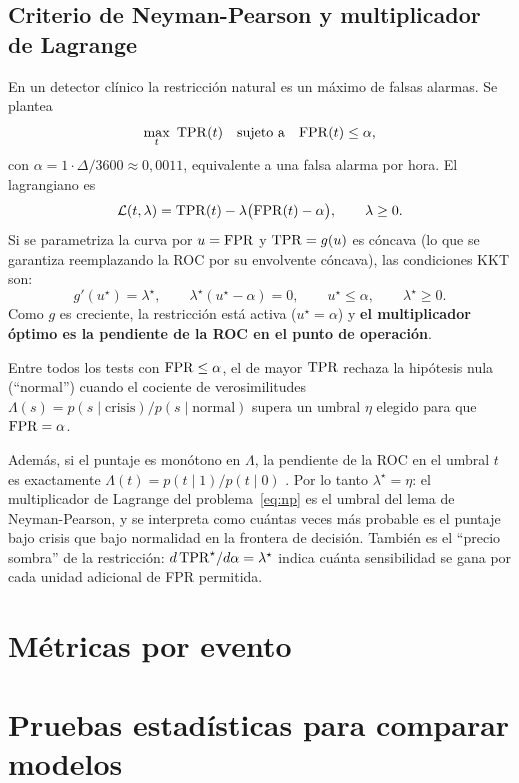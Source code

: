 \subsection{Criterio de Neyman-Pearson y multiplicador de Lagrange}

En un detector clínico la restricción natural es un máximo de falsas alarmas. Se plantea
\begin{equation}
\max_t\ \TPR(t)\quad\text{sujeto a}\quad\FPR(t)\le\alpha,
\label{eq:np}
\end{equation}
con $\alpha = 1\cdot\Delta/3600\approx 0{,}0011$, equivalente a una falsa alarma por hora. El lagrangiano es
\begin{equation}
\mathcal{L}(t,\lambda) = \mathrm{TPR}(t) - \lambda\big(\mathrm{FPR}(t)-\alpha\big),\qquad\lambda\ge 0.
\end{equation}
Si se parametriza la curva por $u = \mathrm{FPR}$ y $\mathrm{TPR} = g(u)$ es cóncava (lo que se garantiza reemplazando la ROC por su envolvente cóncava), las condiciones KKT son:
\[
g'(u^\star) = \lambda^\star,\qquad \lambda^\star(u^\star-\alpha) = 0,\qquad u^\star\le\alpha,\qquad\lambda^\star\ge 0.
\]
Como $g$ es creciente, la restricción está activa ($u^\star = \alpha$) y \textbf{el multiplicador óptimo es la pendiente de la ROC en el punto de operación}.

\begin{teorema}
Entre todos los tests con $\mathrm{FPR}\le\alpha$, el de mayor $\mathrm{TPR}$ rechaza la hipótesis nula (``normal'') cuando el cociente de verosimilitudes $\Lambda(s) = p(s\mid\text{crisis})/p(s\mid\text{normal})$ supera un umbral $\eta$ elegido para que $\mathrm{FPR} = \alpha$.
\end{teorema}

Además, si el puntaje es monótono en $\Lambda$, la pendiente de la ROC en el umbral $t$ es exactamente $\Lambda(t) = p(t\mid 1)/p(t\mid 0)$ \parencite{fawcett2006}. Por lo tanto $\lambda^\star = \eta$: el multiplicador de Lagrange del problema~\eqref{eq:np} es el umbral del lema de Neyman-Pearson, y se interpreta como cuántas veces más probable es el puntaje bajo crisis que bajo normalidad en la frontera de decisión. También es el ``precio sombra'' de la restricción: $d\,\mathrm{TPR}^\star/d\alpha = \lambda^\star$ indica cuánta sensibilidad se gana por cada unidad adicional de FPR permitida.


\section{Métricas por evento}


\section{Pruebas estadísticas para comparar modelos}


